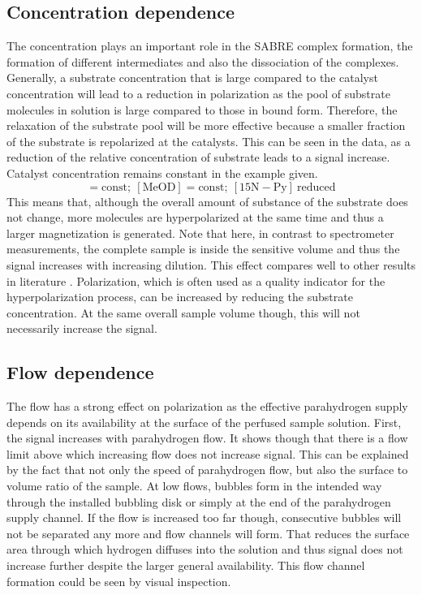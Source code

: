         \subsection{Concentration dependence}
            The concentration plays an important role in the SABRE complex formation, the formation of different intermediates and also the dissociation of the complexes. Generally, a substrate concentration that is large compared to the catalyst concentration will lead to a reduction in polarization as the pool of substrate molecules in solution is large compared to those in bound form. Therefore, the relaxation of the substrate pool will be more effective because a smaller fraction of the substrate is repolarized at the catalysts. This can be seen in the data, as a reduction of the relative concentration of substrate leads to a signal increase. Catalyst concentration remains constant in the example given.
            \begin{equation*}
                [\mathrm{IrIMes}] = \mathrm{const};~[\mathrm{MeOD}] = \mathrm{const};~[\mathrm{15N-Py}]~\mathrm{reduced}
            \end{equation*}
            This means that, although the overall amount of substance of the substrate does not change, more molecules are hyperpolarized at the same time and thus a larger magnetization is generated. Note that here, in contrast to spectrometer measurements, the complete sample is inside the sensitive volume and thus the signal increases with increasing dilution. This effect compares well to other results in literature . Polarization, which is often used as a quality indicator for the hyperpolarization process, can be increased by reducing the substrate concentration. At the same overall sample volume though, this will not necessarily increase the signal.
        \subsection{Flow dependence}
        The flow has a strong effect on polarization as the effective parahydrogen supply depends on its availability at the surface of the perfused sample solution. First, the signal increases with parahydrogen flow. It shows though that there is a flow limit above which increasing flow does not increase signal. This can be explained by the fact that not only the speed of parahydrogen flow, but also the surface to volume ratio of the sample. At low flows, bubbles form in the intended way through the installed bubbling disk or simply at the end of the parahydrogen supply channel. If the flow is increased too far though, consecutive bubbles will not be separated any more and flow channels will form.  That reduces the surface area through which hydrogen diffuses into the solution and thus signal does not increase further despite the larger general availability. This flow channel formation could be seen by visual inspection.
